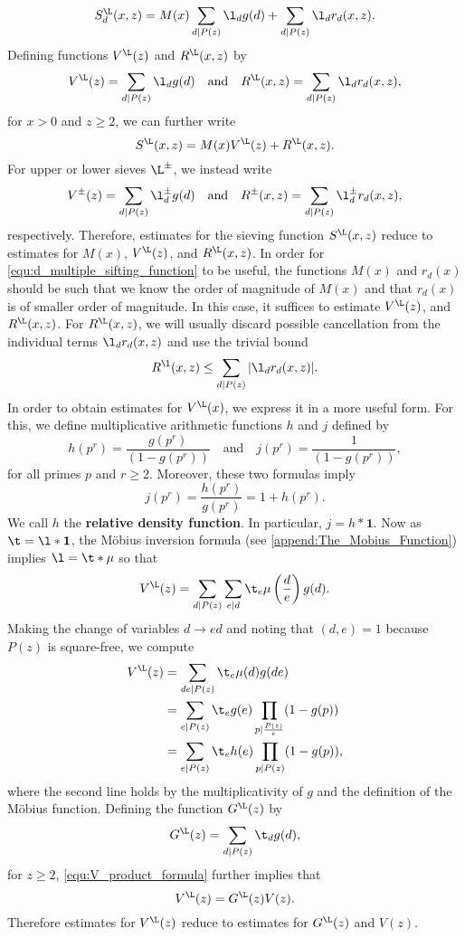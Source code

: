     \[
      S_{d}^{\L}(x,z) = M(x)\sum_{d \mid P(z)}\l_{d}g(d)+\sum_{d \mid P(z)}\l_{d}r_{d}(x,z).
    \]
    Defining functions $V^{\L}(z)$ and $R^{\L}(x,z)$ by
     \[
      V^{\L}(z) = \sum_{d \mid P(z)}\l_{d}g(d) \quad \text{and} \quad R^{\L}(x,z) = \sum_{d \mid P(z)}\l_{d}r_{d}(x,z),
    \]
    for $x > 0$ and $z \ge 2$, we can further write
    \[
      S^{\L}(x,z) = M(x)V^{\L}(z)+R^{\L}(x,z).
    \]
    For upper or lower sieves $\L^{\pm}$, we instead write
     \[
      V^{\pm}(z) = \sum_{d \mid P(z)}\l_{d}^{\pm}g(d) \quad \text{and} \quad R^{\pm}(x,z) = \sum_{d \mid P(z)}\l_{d}^{\pm}r_{d}(x,z),
    \]
    respectively. Therefore, estimates for the sieving function $S^{\L}(x,z)$ reduce to estimates for $M(x)$, $V^{\L}(z)$, and $R^{\L}(x,z)$. In order for \cref{equ:d_multiple_sifting_function} to be useful, the functions $M(x)$ and $r_{d}(x)$ should be such that we know the order of magnitude of $M(x)$ and that $r_{d}(x)$ is of smaller order of magnitude. In this case, it suffices to estimate $V^{\L}(z)$, and $R^{\L}(x,z)$. For $R^{\L}(x,z)$, we will usually discard possible cancellation from the individual terms $\l_{d}r_{d}(x,z)$ and use the trivial bound
    \[
      R^{\l}(x,z) \le \sum_{d \mid P(z)}|\l_{d}r_{d}(x,z)|.
    \]
    In order to obtain estimates for $V^{\L}(x)$, we express it in a more useful form. For this, we define multiplicative arithmetic functions $h$ and $j$ defined by
    \[
      h(p^{r}) = \frac{g(p^{r})}{(1-g(p^{r}))} \quad \text{and} \quad j(p^{r}) = \frac{1}{(1-g(p^{r}))},
    \]
    for all primes $p$ and $r \ge 2$. Moreover, these two formulas imply
    \[
      j(p^{r}) = \frac{h(p^{r})}{g(p^{r})} = 1+h(p^{r}).
    \]
    We call $h$ the \textbf{relative density function}. In particular, $j = h \ast \mathbf{1}$. Now as $\t = \l \ast \mathbf{1}$, the M\"obius inversion formula (see \cref{append:The_Mobius_Function}) implies $\l = \t \ast \mu$ so that
    \[
      V^{\L}(z) = \sum_{d \mid P(z)}\sum_{e \mid d}\t_{e}\mu\left(\frac{d}{e}\right)g(d).
    \]
    Making the change of variables $d \to ed$ and noting that $(d,e) = 1$ because $P(z)$ is square-free, we compute
    \begin{align*}
      V^{\L}(z) &= \sum_{de \mid P(z)}\t_{e}\mu(d)g(de) \\
      &= \sum_{e \mid P(z)}\t_{e}g(e)\prod_{p \mid \frac{P(z)}{e}}(1-g(p)) \\
      &= \sum_{e \mid P(z)}\t_{e}h(e)\prod_{p \mid P(z)}(1-g(p)),
    \end{align*}
    where the second line holds by the multiplicativity of $g$ and the definition of the M\"obius function. Defining the function $G^{\L}(z)$ by
    \[
      G^{\L}(z) = \sum_{d \mid P(z)}\t_{d}g(d),
    \]
    for $z \ge 2$, \cref{equ:V_product_formula} further implies that
    \[
      V^{\L}(z) = G^{\L}(z)V(z).
    \]
    Therefore estimates for $V^{\L}(z)$ reduce to estimates for $G^{\L}(z)$ and $V(z)$.
  \section{}
